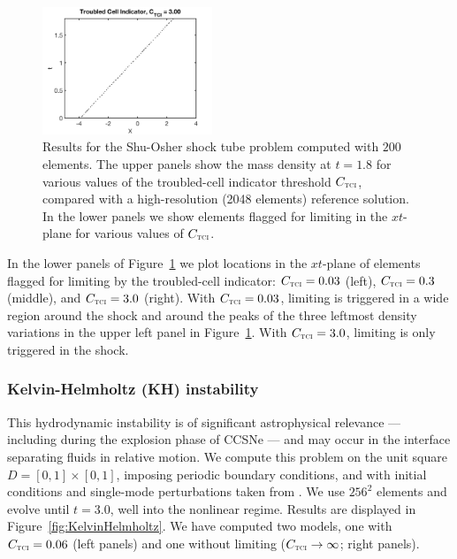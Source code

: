\documentclass[letterpaper]{jpconf}
\newcommand{\TCI}{\textnormal{\tiny\textsc{TCI}}}
\begin{document}
\begin{figure}[h]
\begin{minipage}{12pc}
    \includegraphics[width=12pc]{./Figures/ShuOsher_TCI_1500_Astronum_2018}
  \end{minipage}
  \caption{\label{fig:ShuOsher}Results for the Shu-Osher shock tube problem computed with $200$ elements.  The upper panels show the mass density at $t=1.8$ for various values of the troubled-cell indicator threshold $C_{\TCI}$, compared with a high-resolution (2048 elements) reference solution.  In the lower panels we show elements flagged for limiting in the $xt$-plane for various values of $C_{\TCI}$.}
\end{figure}
In the lower panels of Figure~\ref{fig:ShuOsher} we plot locations in the $xt$-plane of elements flagged for limiting by the troubled-cell indicator: $C_{\TCI}=0.03$ (left), $C_{\TCI}=0.3$ (middle), and $C_{\TCI}=3.0$ (right).  
With $C_{\TCI}=0.03$, limiting is triggered in a wide region around the shock and around the peaks of the three leftmost density variations in the upper left panel in Figure~\ref{fig:ShuOsher}.  
With $C_{\TCI}=3.0$, limiting is only triggered in the shock.  

\subsubsection{Kelvin-Helmholtz (KH) instability}
This hydrodynamic instability is of significant astrophysical relevance --- including during the explosion phase of CCSNe --- and may occur in the interface separating fluids in relative motion.  
We compute this problem on the unit square $D=[0,1]\times[0,1]$, imposing periodic boundary conditions, and with initial conditions and single-mode perturbations taken from \cite{mcnally_etal_2012}.  
We use $256^{2}$ elements and evolve until $t=3.0$, well into the nonlinear regime.  
Results are displayed in Figure~\ref{fig:KelvinHelmholtz}.  
We have computed two models, one with $C_{\TCI}=0.06$ (left panels) and one without limiting ($C_{\TCI}\to\infty$; right panels).  
\end{document}
